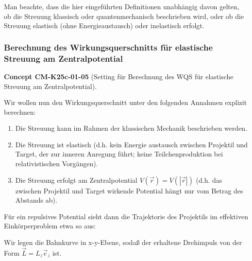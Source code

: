 \documentclass[10pt, letterpaper]{article}
\newcommand{\CustomHeading}[3]{%
  \par\medskip\noindent%
  \textbf{#1 #2} \textnormal{(#3)}.\enskip%
}
\newenvironment{CONC}[2]{\begin{unitbox}\CustomHeading{Concept}{#1}{#2}}{\end{unitbox}}
\begin{document}
Man beachte, dass die hier eingeführten Definitionen unabhängig davon gelten, ob die Streuung klassisch oder quantenmechanisch beschrieben wird, oder ob die Streuung elastisch (ohne Energieaustausch) oder inelastisch erfolgt.



\subsubsection{Berechnung des Wirkungsquerschnitts für elastische Streuung am Zentralpotential}

\begin{CONC}{CM-K25c-01-05}{Setting für Berechnung des WQS für elastische Streuung am Zentralpotential}
Wir wollen nun den Wirkungsquerschnitt unter den folgenden Annahmen explizit berechnen:
\begin{enumerate}
\item Die Streuung kann im Rahmen der klassischen Mechanik beschrieben werden.
\item Die Streuung ist elastisch (d.h. kein Energie austausch zwischen Projektil und Target, der zur inneren Anregung führt; keine Teilchenproduktion bei relativistischen Vorgängen).
\item Die Streuung erfolgt am Zentralpotential $V(\vec{r})=V(|\vec{r}|)$ (d.h. das zwischen Projektil und Target wirkende Potential hängt nur vom Betrag des Abstands ab).
\end{enumerate}
\end{CONC}


Für ein repulsives Potential sieht dann die Trajektorie des Projektils im effektiven Einkörperproblem etwa so aus:


\begin{center}
\end{center}



Wir legen die Bahnkurve in x-y-Ebene, sodaß der erhaltene Drehimpuls von der Form $\vec{L}=L_z\vec{e}_z$ ist.
\end{document}
